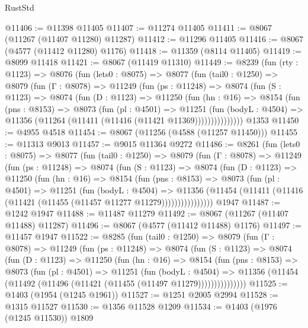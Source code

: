 \begin{lexlean}{RustStd}
\begin{coremodule}
@11406 := @11398 @11405
@11407 := @11274 @11405
@11411 := @8067 (@11267 (@11407 @11280) @11287)
@11412 := @11296 @11405
@11416 := @8067 (@4577 (@11412 @11280) @1176)
@11418 := @11359 (@8114 @11405)
@11419 := @8099 @11418
@11421 := @8067 (@11419 @11310)
@11449 := @8239
    (fun (rty : @1123) =>
    @8076
      (fun (lets0 : @8075) =>
      @8077
        (fun (tail0 : @1250) =>
        @8079
          (fun (Γ : @8078) =>
          @11249
            (fun (ps : @11248) =>
            @8074
              (fun (S : @1123) =>
              @8074
                (fun (D : @1123) =>
                @11250
                  (fun (hn : @16) =>
                  @8154
                    (fun (pns : @8153) =>
                    @8073
                      (fun (pl : @4501) =>
                      @11251
                        (fun (bodyL : @4504) =>
                        @11356 (@11264 (@11411 (@11416 (@11421 @11369)))))))))))))))
    @1353
@11450 := @4955 @4518
@11454 := @8067 (@11256 (@4588 (@11257 @11450)))
@11455 := @11313 @9013
@11457 := @9015 @11364 @9272
@11486 := @8261
    (fun (lets0 : @8075) =>
    @8077
      (fun (tail0 : @1250) =>
      @8079
        (fun (Γ : @8078) =>
        @11249
          (fun (ps : @11248) =>
          @8074
            (fun (S : @1123) =>
            @8074
              (fun (D : @1123) =>
              @11250
                (fun (hn : @16) =>
                @8154
                  (fun (pns : @8153) =>
                  @8073
                    (fun (pl : @4501) =>
                    @11251
                      (fun (bodyL : @4504) =>
                      @11356
                        (@11454
                          (@11411 (@11416 (@11421 (@11455 (@11457 @11277 @11279))))))))))))))))
    @1947
@11487 := @1242 @1947
@11488 := @11487 @11279
@11492 := @8067 (@11267 (@11407 @11488) @11287)
@11496 := @8067 (@4577 (@11412 @11488) @1176)
@11497 := @11457 @1947
@11522 := @8285
    (fun (tail0 : @1250) =>
    @8079
      (fun (Γ : @8078) =>
      @11249
        (fun (ps : @11248) =>
        @8074
          (fun (S : @1123) =>
          @8074
            (fun (D : @1123) =>
            @11250
              (fun (hn : @16) =>
              @8154
                (fun (pns : @8153) =>
                @8073
                  (fun (pl : @4501) =>
                  @11251
                    (fun (bodyL : @4504) =>
                    @11356 (@11454 (@11492 (@11496 (@11421 (@11455 (@11497 @11279)))))))))))))))
@11525 := @1403 (@1954 (@1245 @1961))
@11527 := @1251 @2005 @2994
@11528 := @1315 @11527
@11530 := @1356 @11528 @1209
@11534 := @1403 (@1976 (@1245 @11530)) @1809

\end{coremodule}
\end{lexlean}
